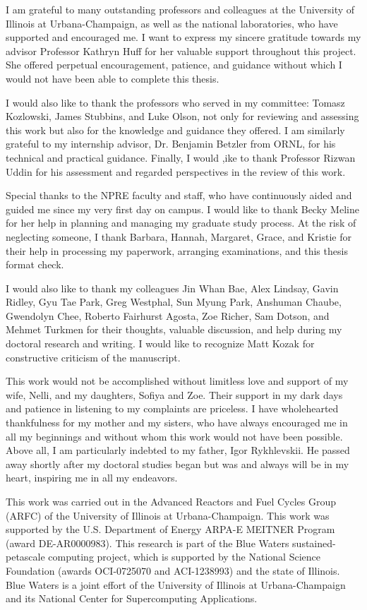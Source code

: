 I am grateful to many outstanding professors and colleagues at the 
University of Illinois at Urbana-Champaign, as well as the national 
laboratories, who have supported and encouraged me. I want to express my 
sincere gratitude towards my advisor Professor Kathryn Huff
for her valuable support throughout this project. She offered perpetual 
encouragement, patience, and guidance without which I would not have been able 
to complete this thesis. 

I would also like to thank the professors who served in my committee: Tomasz 
Kozlowski, James Stubbins, and Luke Olson, not only for reviewing and 
assessing this work but also for the knowledge and guidance they offered. I 
am similarly grateful to my internship advisor, Dr. Benjamin Betzler from 
ORNL, for his technical and practical guidance. Finally, I would ,ike to thank 
Professor Rizwan Uddin for his assessment and regarded perspectives in the 
review of this work.

Special thanks to the NPRE faculty and staff, who have continuously aided and 
guided me since my very first day on campus. I would like to thank Becky 
Meline for her help in planning and managing my graduate study process. At the 
risk of neglecting someone, I thank Barbara, Hannah, Margaret, Grace, and 
Kristie for their help in processing my paperwork, arranging examinations, and 
this thesis format check. 

I would also like to thank my colleagues Jin Whan Bae, Alex Lindsay, Gavin 
Ridley, Gyu Tae Park, Greg Westphal, Sun Myung Park, Anshuman Chaube, 
Gwendolyn Chee, Roberto Fairhurst Agosta, Zoe Richer, Sam Dotson, and Mehmet 
Turkmen for their thoughts, valuable discussion, and help during my doctoral 
research and writing. I would like to recognize Matt Kozak for constructive 
criticism of the manuscript. 

This work would not be accomplished without limitless love and support of my 
wife, Nelli, and my daughters, Sofiya and Zoe. Their support in my dark days 
and patience in listening to my complaints are priceless. I have wholehearted 
thankfulness for my mother and my sisters, who have always encouraged me in 
all my beginnings and without whom this work would not have been possible. 
Above all, I am particularly indebted to my father, Igor Rykhlevskii. He 
passed away shortly after my doctoral studies began but was and always will be 
in my heart, inspiring me in all my endeavors.

This work was carried out in the Advanced Reactors and Fuel Cycles Group 
(ARFC) of the University of Illinois at Urbana-Champaign. This work was 
supported by the U.S. Department of Energy ARPA-E MEITNER Program (award 
DE-AR0000983). This research is part of the Blue Waters sustained-petascale 
computing project, which is supported by the National Science Foundation 
(awards OCI-0725070 and ACI-1238993) and the state of Illinois. Blue Waters is 
a joint effort of the University of Illinois at Urbana-Champaign and its 
National Center for Supercomputing Applications.